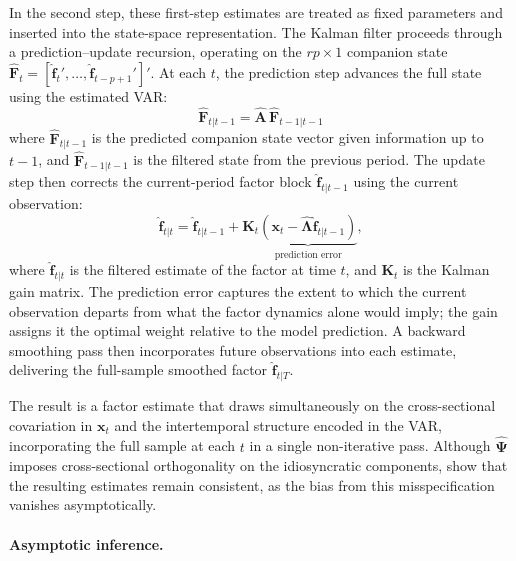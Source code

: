 In the second step, these first-step estimates are treated as fixed parameters and inserted into the state-space representation. The Kalman filter proceeds through a prediction--update recursion, operating on the $rp \times 1$ companion state $\hat{\boldsymbol{F}}_t = [\hat{\boldsymbol{f}}_t', \dots, \hat{\boldsymbol{f}}_{t-p+1}']'$. At each $t$, the prediction step advances the full state using the estimated VAR:
\begin{equation}
\hat{\boldsymbol{F}}_{t|t-1} = \hat{\boldsymbol{A}}\,\hat{\boldsymbol{F}}_{t-1|t-1}
\end{equation}
where $\hat{\boldsymbol{F}}_{t|t-1}$ is the predicted companion state vector given information up to $t-1$, and $\hat{\boldsymbol{F}}_{t-1|t-1}$ is the filtered state from the previous period. The update step then corrects the current-period factor block $\hat{\boldsymbol{f}}_{t|t-1}$ using the current observation:
\begin{equation}
\hat{\boldsymbol{f}}_{t|t}
  = \hat{\boldsymbol{f}}_{t|t-1}
    + \boldsymbol{K}_t
      \underbrace{\!\left(\boldsymbol{x}_t
        - \hat{\boldsymbol{\Lambda}}\hat{\boldsymbol{f}}_{t|t-1}\right)\!}
        _{\text{prediction error}},
\label{eq:kalman_update}
\end{equation}
where $\hat{\boldsymbol{f}}_{t|t}$ is the filtered estimate of the factor at time $t$, and $\boldsymbol{K}_t$ is the Kalman gain matrix. The prediction error captures the extent to which the current observation departs from what the factor dynamics alone would imply; the gain assigns it the optimal weight relative to the model prediction. A backward smoothing pass then incorporates future observations into each estimate, delivering the full-sample smoothed factor $\hat{\boldsymbol{f}}_{t|T}$.

The result is a factor estimate that draws simultaneously on the cross-sectional covariation in $\boldsymbol{x}_t$ and the intertemporal structure encoded in the VAR, incorporating the full sample at each $t$ in a single non-iterative pass. Although $\hat{\boldsymbol{\Psi}}$ imposes cross-sectional orthogonality on the idiosyncratic components, \citet{doz2011two} show that the resulting estimates remain consistent, as the bias from this misspecification vanishes asymptotically.

\paragraph{Asymptotic inference.}

